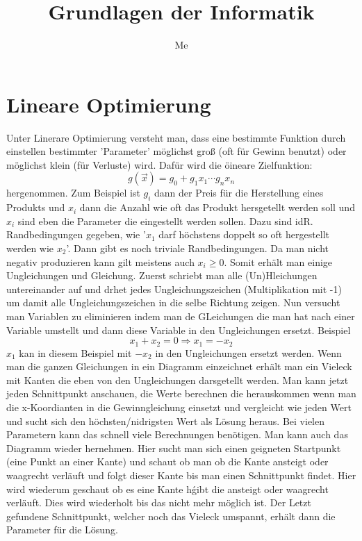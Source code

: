 \documentclass[a4paper]{scrartcl}
\author{Me}
\title{Grundlagen der Informatik}
\begin{document}
    \maketitle
    \newpage
    \tableofcontents
    \newpage

    \section{Lineare Optimierung}
    Unter Linerare Optimierung versteht man, dass eine bestimmte Funktion durch einstellen bestimmter 'Parameter' möglichst groß (oft für Gewinn benutzt) oder möglichst klein (für Verluste) wird.
    Dafür wird die öineare Zielfunktion: 
    \begin{equation*}
        g(\vec{x}) = g_0 + g_1x_1 \cdots g_nx_n
    \end{equation*}
    hergenommen. Zum Beispiel ist \(g_i\) dann der Preis für die Herstellung eines Produkts und \(x_i\) dann die Anzahl wie oft das Produkt hersgetellt werden soll und \(x_i\) sind eben die 
    Parameter die eingestellt werden sollen. Dazu sind idR. Randbedingungen gegeben, wie '\(x_1\) darf höchstens doppelt so oft hergestellt werden wie \(x_2\)'. Dann gibt es noch triviale 
    Randbedingungen. Da man nicht negativ produzieren kann gilt meistens auch \(x_i \ge 0\). Somit erhält man einige Ungleichungen und Gleichung. Zuerst schriebt man alle (Un)Hleichungen 
    untereinander auf und drhet jedes Ungleichungszeichen (Multiplikation mit -1) um damit alle Ungleichungszeichen in die selbe Richtung zeigen. Nun versucht man Variablen zu eliminieren
    indem man de GLeichungen die man hat nach einer Variable umstellt und dann diese Variable in den Ungleichungen ersetzt. Beispiel
    \begin{equation*}
        x_1 + x_2 = 0 \Rightarrow x_1 = -x_2    
    \end{equation*}
    \(x_1\) kan in diesem Beispiel mit \(-x_2\) in den Ungleichungen ersetzt werden. Wenn man die ganzen Gleichungen in ein Diagramm einzeichnet erhält man ein Vieleck mit Kanten die eben 
    von den Ungleichungen darsgetellt werden. Man kann jetzt jeden Schnittpunkt anschauen, die Werte berechnen die herauskommen wenn man die x-Koordianten in die Gewinngleichung einsetzt und
    vergleicht wie jeden Wert und sucht sich den höchsten/nidrigsten Wert als Lösung heraus. Bei vielen Parametern kann das schnell viele Berechnungen benötigen. Man kann auch das Diagramm wieder
    hernehmen. Hier sucht man sich einen geigneten Startpunkt (eine Punkt an einer Kante) und schaut ob man ob die Kante ansteigt oder waagrecht verläuft und folgt dieser Kante bis man 
    einen Schnittpunkt findet. Hier wird wiederum geschaut ob es eine Kante hǵibt die ansteigt oder waagrecht verläuft. Dies wird wiederholt bis das nicht mehr möglich ist. Der Letzt gefundene
    Schnittpunkt, welcher noch das Vieleck umspannt, erhält dann die Parameter für die Lösung. 
\end{document}

